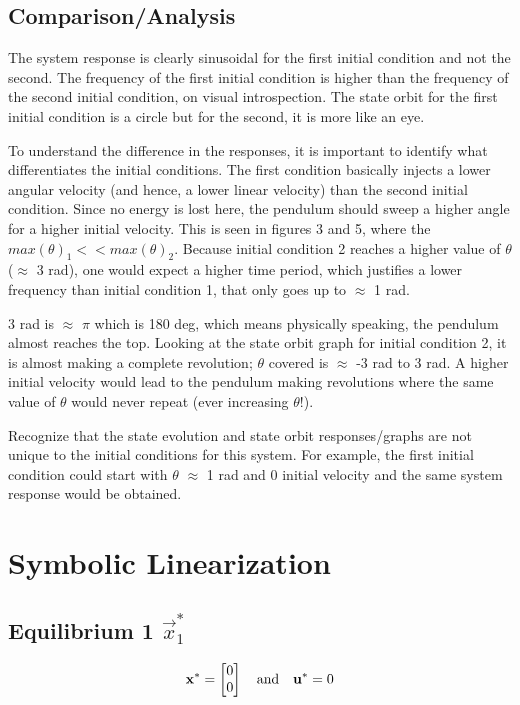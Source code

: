 \documentclass[10pt]{article}
\begin{document}
\subsection{Comparison/Analysis}
    The system response is clearly sinusoidal for the first initial condition and not the second. The frequency of the first initial condition is higher than the frequency of the second initial condition, on visual introspection. The state orbit for the first initial condition is a circle but for the second, it is more like an eye. 
    
    To understand the difference in the responses, it is important to identify what differentiates the initial conditions. The first condition basically injects a lower angular velocity (and hence, a lower linear velocity) than the second initial condition. Since no energy is lost here, the pendulum should sweep a higher angle for a higher initial velocity. This is seen in figures 3 and 5, where the \begin{math}
     max(\theta)_1 << max(\theta)_2
    \end{math}. Because initial condition 2 reaches a higher value of $\theta$ ($\approx$ 3 rad), one would expect a higher time period, which justifies a lower frequency than initial condition 1, that only goes up to $\approx$ 1 rad. 
    
    3 rad is $\approx$ $\pi$ which is 180 deg, which means physically speaking, the pendulum almost reaches the top. Looking at the state orbit graph for initial condition 2, it is almost making a complete revolution; $\theta$ covered is $\approx$ -3 rad to 3 rad. A higher initial velocity would lead to the pendulum making revolutions where the same value of $\theta$ would never repeat (ever increasing $\theta$!). 
    
    Recognize that the state evolution and state orbit responses/graphs are not unique to the initial conditions for this system. For example, the first initial condition could start with $\theta$ $\approx$ 1 rad and 0 initial velocity and the same system response would be obtained. 
    

\section{Symbolic Linearization}

\subsection{Equilibrium 1 \texorpdfstring{$\vec{x}_1^*$}{x1*}}
    \begin{equation*}
         \mathbf{x}^* = \begin{bmatrix} 0\\0 \end{bmatrix}
         \quad
         \text{and}
         \quad
         \mathbf{u}^* = 0
    \end{equation*}
\end{document}
